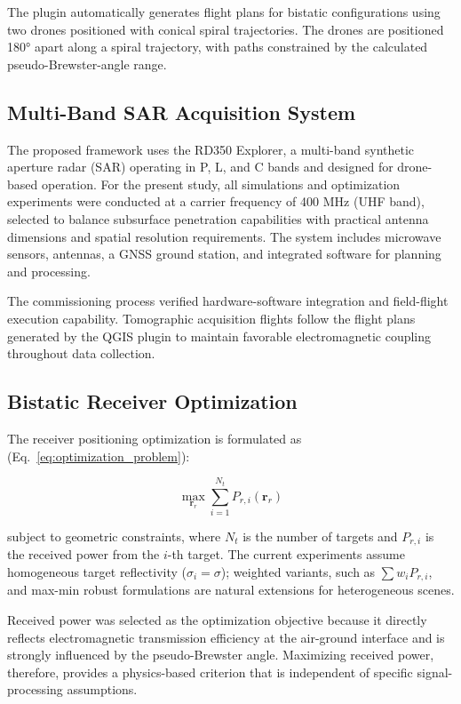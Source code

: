 \documentclass[conference]{IEEEtran}
\begin{document}
The plugin automatically generates flight plans for bistatic configurations using two drones positioned with conical spiral trajectories. The drones are positioned 180° apart along a spiral trajectory, with paths constrained by the calculated pseudo-Brewster-angle range.

\subsection{Multi-Band SAR Acquisition System}

The proposed framework uses the RD350 Explorer, a multi-band synthetic aperture radar (SAR) operating in P, L, and C bands and designed for drone-based operation. For the present study, all simulations and optimization experiments were conducted at a carrier frequency of 400 MHz (UHF band), selected to balance subsurface penetration capabilities with practical antenna dimensions and spatial resolution requirements. The system includes microwave sensors, antennas, a GNSS ground station, and integrated software for planning and processing.

The commissioning process verified hardware-software integration and field-flight execution capability. Tomographic acquisition flights follow the flight plans generated by the QGIS plugin to maintain favorable electromagnetic coupling throughout data collection.

\subsection{Bistatic Receiver Optimization}

The receiver positioning optimization is formulated as (Eq.~\ref{eq:optimization_problem}):

\begin{equation}
\max_{\mathbf{r}_r} \sum_{i=1}^{N_t} P_{r,i}(\mathbf{r}_r)
\label{eq:optimization_problem}
\end{equation}

subject to geometric constraints, where $N_t$ is the number of targets and $P_{r,i}$ is the received power from the $i$-th target. The current experiments assume homogeneous target reflectivity ($\sigma_i = \sigma$); weighted variants, such as $\sum w_i P_{r,i}$, and max-min robust formulations are natural extensions for heterogeneous scenes.

Received power was selected as the optimization objective because it directly reflects electromagnetic transmission efficiency at the air-ground interface and is strongly influenced by the pseudo-Brewster angle. Maximizing received power, therefore, provides a physics-based criterion that is independent of specific signal-processing assumptions.
\end{document}
